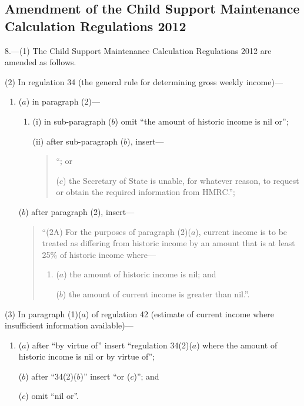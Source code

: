 \documentclass[12pt,a4paper]{article}
\begin{document}
\subsection[8. Amendment of the Child Support Maintenance Calculation Regulations 2012]{Amendment of the Child Support Maintenance Calculation Regulations 2012}

8.---(1)  The Child Support Maintenance Calculation Regulations 2012 are amended as follows.

(2) In regulation 34 (the general rule for determining gross weekly income)—
\begin{enumerate}\item[]
($a$) in paragraph (2)—
\begin{enumerate}\item[]
(i) in sub-paragraph ($b$)  omit “the amount of historic income is nil or”;

(ii) after sub-paragraph ($b$), insert—
\begin{quotation}
“; or

($c$) the Secretary of State is unable, for whatever reason, to request or obtain the required information from HMRC.”;
\end{quotation}
\end{enumerate}

($b$) after paragraph (2), insert—
\begin{quotation}
“(2A) For the purposes of paragraph (2)($a$), current income is to be treated as differing from historic income by an amount that is at least 25\% of historic income where—
\begin{enumerate}\item[]
($a$) the amount of historic income is nil; and

($b$) the amount of current income is greater than nil.”.
\end{enumerate}
\end{quotation}
\end{enumerate}

(3) In paragraph (1)($a$)  of regulation 42 (estimate of current income where insufficient information available)—
\begin{enumerate}\item[]
($a$) after “by virtue of” insert “regulation 34(2)($a$)  where the amount of historic income is nil or by virtue of”;

($b$) after “34(2)($b$)” insert “or ($c$)”; and

($c$) omit “nil or”.
\end{enumerate}
\end{document}
